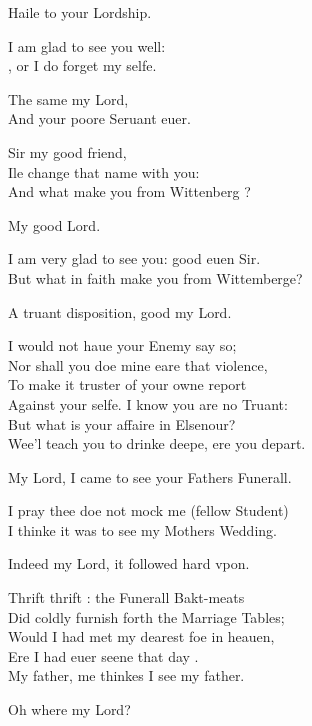 \documentclass[a5paper,DIV=calc,11pt]{scrbook}
\begin{document}
\begin{drama*}
    
    \horspeaks Haile to your Lordship.
    
    \hamspeaks I am glad to see you well:\\
    \hor, or I do forget my selfe.
    
    \horspeaks The same my Lord,\\
    And your poore Seruant euer.
    
    \hamspeaks Sir my good friend,\\
    Ile change that name with you:\\
    And what make you from Wittenberg \hor?
    
    
    \marspeaks My good Lord.
    
    \hamspeaks I am very glad to see you: good euen Sir.\\
    But what in faith make you from Wittemberge?
    
    \horspeaks A truant disposition, good my Lord.
    
    \hamspeaks I would not haue your Enemy say so;\\
    Nor shall you doe mine eare that violence,\\
    To make it truster of your owne report\\
    Against your selfe. I know you are no Truant:\\
    But what is your affaire in Elsenour?\\
    Wee'l teach you to drinke deepe, ere you depart.
    
    \horspeaks My Lord, I came to see your Fathers Funerall.
    
    \hamspeaks I pray thee doe not mock me (fellow Student)\\
    I thinke it was to see my Mothers Wedding.
    
    \horspeaks Indeed my Lord, it followed hard vpon.
    
    \hamspeaks Thrift thrift \hor: the Funerall Bakt-meats\\
    Did coldly furnish forth the Marriage Tables;\\
    Would I had met my dearest foe in heauen,\\
    Ere I had euer seene that day \hor.\\
    My father, me thinkes I see my father.
    
    \horspeaks Oh where my Lord?
    

\end{drama*}
\end{document}
